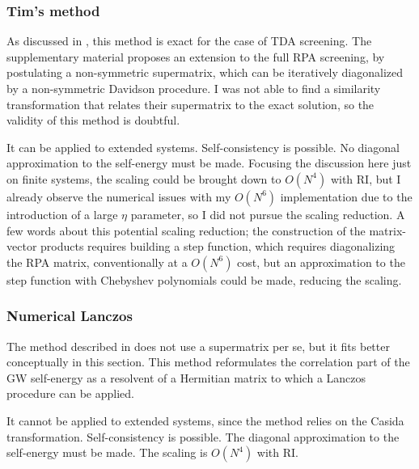 \subsubsection{Tim's method}
As discussed in \cite{bintrim2021full}, this method is exact for the case of TDA screening. The supplementary material proposes an extension to the full RPA screening, by postulating a non-symmetric supermatrix, which can be iteratively diagonalized by a non-symmetric Davidson procedure. I was not able to find a similarity transformation that relates their supermatrix to the exact solution, so the validity of this method is doubtful.
\begin{tcolorbox}
It can be applied to extended systems. Self-consistency is possible. No diagonal approximation to the self-energy must be made. Focusing the discussion here just on finite systems, the scaling could be brought down to $O(N^4)$ with RI, but I already observe the numerical issues with my $O(N^6)$ implementation due to the introduction of a large $\eta$ parameter, so I did not pursue the scaling reduction. A few words about this potential scaling reduction; the construction of the matrix-vector products requires building a step function, which requires diagonalizing the RPA matrix, conventionally at a $O(N^6)$ cost, but an approximation to the step function with Chebyshev polynomials could be made, reducing the scaling.
\end{tcolorbox}
\subsubsection{Numerical Lanczos}
The method described in \cite{gao2024efficient} does not use a supermatrix per se, but it fits better conceptually in this section. This method reformulates the correlation part of the GW self-energy as a resolvent of a Hermitian matrix to which a Lanczos procedure can be applied.
\begin{tcolorbox}
    It cannot be applied to extended systems, since the method relies on the Casida transformation. Self-consistency is possible. The diagonal approximation to the self-energy must be made. The scaling is $O(N^4)$ with RI.
\end{tcolorbox}

